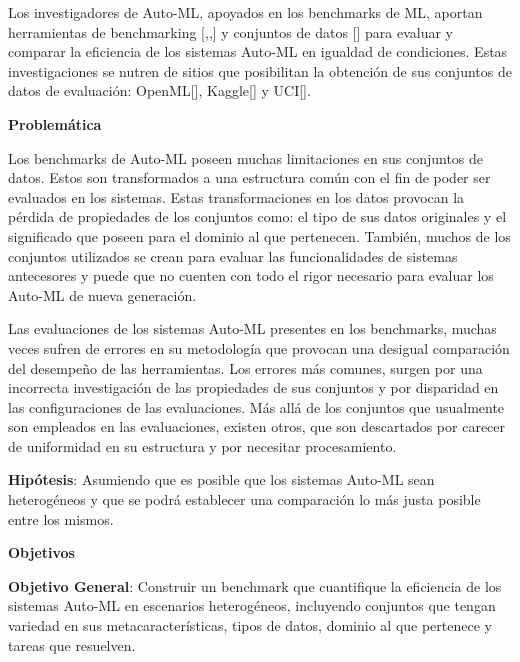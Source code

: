 Los investigadores de Auto-ML, apoyados en los benchmarks de ML, aportan herramientas de benchmarking [\cite{10},\cite{15},\cite{31}] y conjuntos de datos [\cite{28}] para 
evaluar y comparar la eficiencia de los sistemas Auto-ML en igualdad de condiciones. Estas investigaciones se nutren de sitios que posibilitan la obtención de sus conjuntos de 
datos de evaluación: OpenML[\cite{43}], Kaggle[\cite{44}] y UCI[\cite{45}].

\begin{flushleft} 
    {\Large { \textbf{Problemática}}}
\end{flushleft}
Los benchmarks de Auto-ML poseen muchas limitaciones en sus conjuntos de datos. Estos son transformados a una estructura común con el fin de poder ser evaluados en los 
sistemas. Estas transformaciones en los datos provocan la pérdida de propiedades de los conjuntos como: el tipo de sus datos originales y el significado que 
poseen para el dominio al que pertenecen. También, muchos de los conjuntos utilizados se crean para evaluar las funcionalidades de sistemas antecesores y puede que no cuenten con 
todo el rigor necesario para evaluar los Auto-ML de nueva generación.

Las evaluaciones de los sistemas Auto-ML presentes en los benchmarks, muchas veces sufren de errores en su metodología que provocan una desigual comparación del 
desempeño de las herramientas. Los errores más comunes, surgen por una incorrecta investigación de las propiedades de sus conjuntos y por disparidad 
en las configuraciones de las evaluaciones. Más allá de los conjuntos que usualmente son empleados en las evaluaciones, existen otros, que son descartados por carecer 
de uniformidad en su estructura y por necesitar procesamiento.


\textbf{Hipótesis}: Asumiendo que es posible que los sistemas Auto-ML sean heterogéneos y que se podrá establecer una comparación lo más 
justa posible entre los mismos.

\begin{flushleft} 
    {\Large {\textbf{Objetivos}}}
\end{flushleft}

\textbf{Objetivo General}: Construir un benchmark que cuantifique la eficiencia de los sistemas Auto-ML en escenarios heterogéneos, incluyendo conjuntos que tengan 
variedad en sus metacaracterísticas, tipos de datos, dominio al que pertenece y tareas que resuelven. 

